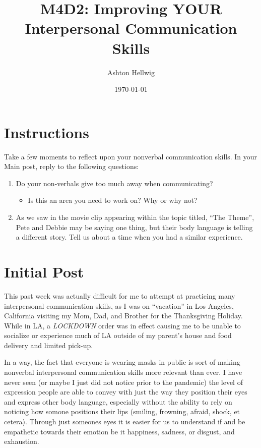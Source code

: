 \documentclass[stu,12pt]{apa7}
\title{%
    M4D2: Improving YOUR Interpersonal Communication Skills
  }
\author{Ashton Hellwig}
\date{\today}
\begin{document}
  \maketitle


  \section*{Instructions}
    Take a few moments to reflect upon your nonverbal communication skills.
      In your Main post, reply to the following questions:

    \begin{enumerate}
      \item Do your non-verbals give too much away when communicating?
      \begin{itemize}
        \item Is this an area you need to work on? Why or why not?
      \end{itemize}
      \item As we saw in the movie clip appearing within the topic titled,
        ``The Theme'', Pete and Debbie may be saying one thing, but their body
        language is telling a different story. Tell us about a time when you had
        a similar experience.
    \end{enumerate}


  \newpage
  \section{Initial Post}
    This past week was actually difficult for me to attempt at practicing
      many interpersonal communication skills, as I was on ``vacation'' in
      Los Angeles, California visiting my Mom, Dad, and Brother for the
      Thanksgiving Holiday. While in LA, a \textit{LOCKDOWN} order was in effect
      causing me to be unable to socialize or experience much of LA outside of
      my parent's house and food delivery and limited pick-up.

    In a way, the fact that everyone is wearing masks in public is sort of
      making nonverbal interpersonal communication skills more relevant than
      ever. I have never seen (or maybe I just did not notice prior to the
      pandemic) the level of expression people are able to convey with just
      the way they position their eyes and express other body language,
      especially without the ability to rely on noticing how somone positions
      their lips (smiling, frowning, afraid, shock, et cetera). Through just
      someones eyes it is easier for us to understand if and be empathetic
      towards their emotion be it happiness, sadness, or disgust, and
      exhaustion.




\end{document}
